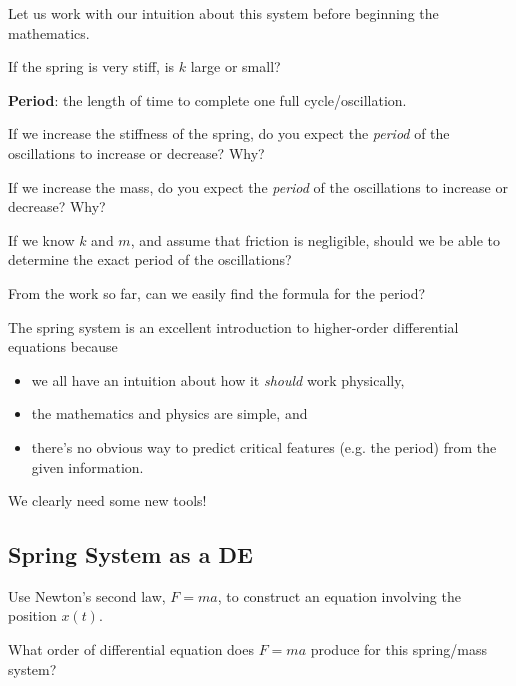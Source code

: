 \newpage
Let us work with our intuition about this system before beginning the mathematics.

\problem If the spring is very stiff, is $k$ large or small?  \vfill

\newpage
{\bf Period}: the length of time to complete one full cycle/oscillation.
\vspace{0.2in}

\problem If we increase the stiffness of the spring, do you expect the
{\em period} of the oscillations to increase or decrease?  Why?

\vfill

If we increase the mass, do you expect
the \emph{period} of the oscillations to increase or decrease? Why?

\vfill

\newpage

\problem If we know $k$ and $m$, and assume that friction is
negligible, should we be able to determine the exact period of the
oscillations?  \vfill


\vfill

From the work so far, can we easily find the formula for the period?

\vfill

\newpage

The spring system is an excellent introduction to higher-order differential equations because 
\begin{itemize}
\item we all have an intuition about how it \emph{should} work physically,
\item the mathematics and physics are simple, and
\item there's no obvious way to predict critical features (e.g. the
  period) from the given information.
\end{itemize}
We clearly need some new tools!

\newpage
{}
\subsection*{Spring System as a DE}

\problem Use Newton's second law, $F = ma$, to construct an equation
involving the position $x(t)$.  \vfill

What order of differential equation does $F=ma$ produce for this
spring/mass system?

\vfill

\newpage

